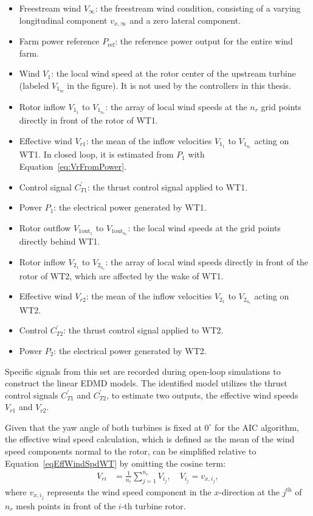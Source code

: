 \begin{itemize}
    \item Freestream wind $V_\infty$: the freestream wind condition, consisting of a varying longitudinal component $v_{x,\infty}$ and a zero lateral component.
    \item Farm power reference $P_{\text{ref}}$: the reference power output for the entire wind farm.
    \item Wind $V_1$: the local wind speed at the rotor center of the upstream turbine (labeled $V_{1_m}$ in the figure). It is not used by the controllers in this thesis.
    \item Rotor inflow $V_{1_1}$ to $V_{1_{n_r}}$: the array of local wind speeds at the $n_r$ grid points directly in front of the rotor of WT1.
    \item Effective wind $V_{r1}$: the mean of the inflow velocities $V_{1_1}$ to $V_{1_{n_r}}$ acting on WT1. In closed loop, it is estimated from $P_1$ with Equation~\eqref{eq:VrFromPower}.
    \item Control signal $C_{T1}^{\prime}$: the thrust control signal applied to WT1.
    \item Power $P_1$: the electrical power generated by WT1.
    \item Rotor outflow $V_{1\text{out}_1}$ to $V_{1\text{out}_{n_r}}$: the local wind speeds at the grid points directly behind WT1.
    \item Rotor inflow $V_{2_1}$ to $V_{2_{n_r}}$: the array of local wind speeds directly in front of the rotor of WT2, which are affected by the wake of WT1.
    \item Effective wind $V_{r2}$: the mean of the inflow velocities $V_{2_1}$ to $V_{2_{n_r}}$ acting on WT2.
    \item Control $C_{T2}^{\prime}$: the thrust control signal applied to WT2.
    \item Power $P_2$: the electrical power generated by WT2.
\end{itemize}
Specific signals from this set are recorded during open-loop simulations to construct the linear EDMD models. The identified model utilizes  the thrust control signals $C_{T1}^{\prime}$ and $C_{T2}^{\prime}$, to estimate two outputs, the effective wind speeds $V_{r1}$ and $V_{r2}$.


Given that the yaw angle of both turbines is fixed at $0^\circ$ for the AIC algorithm, the effective wind speed calculation, which is defined as the mean of the wind speed components normal to the rotor, can be simplified relative to Equation~\eqref{eqEffWindSpdWT} by omitting the cosine term:
\begin{align} \label{eqEffWindSpdWTAIC}
    V_{ri} &=  \frac{1}{n_r} \sum_{j = 1}^{n_r} V_{i_j},  
    \quad  V_{i_j} = v_{x,i_j},
\end{align}
where $v_{x,i_j}$ represents the wind speed component in the $x$-direction at the $j^{\text{th}}$ of $n_r$ mesh points in front of the $i$-th turbine rotor.

